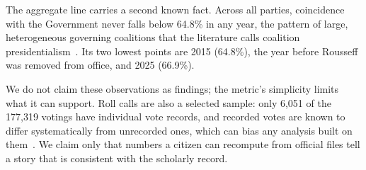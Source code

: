 The aggregate line carries a second known fact. Across all parties, coincidence with the Government never falls below 64.8\% in any year, the pattern of large, heterogeneous governing coalitions that the literature calls coalition presidentialism~\citep{abranches1988presidencialismo,limongi1998bases}. Its two lowest points are 2015 (64.8\%), the year before Rousseff was removed from office, and 2025 (66.9\%).

We do not claim these observations as findings; the metric's simplicity limits what it can support. Roll calls are also a selected sample: only 6,051 of the 177,319 votings have individual vote records, and recorded votes are known to differ systematically from unrecorded ones, which can bias any analysis built on them~\citep{carrubba2006off,hug2010selection}. We claim only that numbers a citizen can recompute from official files tell a story that is consistent with the scholarly record.
